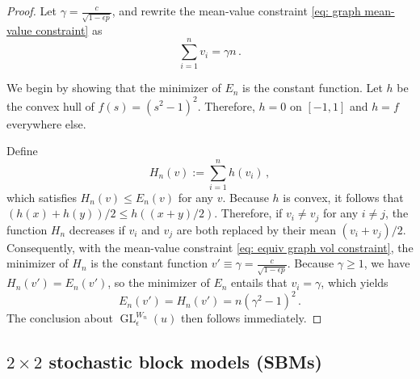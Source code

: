 \documentclass[11pt]{amsart}
\def\ep{\epsilon}
\def\GL{\operatorname{GL}}
\numberwithin{equation}{section}
\begin{document}
\begin{proof}
    Let $\gamma = \frac{c}{\sqrt{1 - \ep p}}$, and rewrite the {mean-value constraint} \eqref{eq: graph mean-value constraint} as 
    \begin{equation}\label{eq: equiv graph vol constraint}
        \sum_{i = 1}^n v_i = \gamma n \,. 
    \end{equation}    
    
    We begin by showing that the minimizer of $E_n$ is
    the constant function. Let $h$ be the convex hull of $f(s) = (s^2 - 1)^2${. Therefore,} $h = 0$ on $[-1,1]$ and $h = f$ everywhere else. 
 
 
    
   Define 
    \begin{equation*}
        H_n(v) := \sum_{i = 1}^n h(v_i) \,,
    \end{equation*}
which satisfies $H_n(v) \leq E_n(v)$ for any $v$.
Because $h$ is convex, it follows that $(h(x) + h(y))/2 \leq h\left((x + y)/2\right)$. Therefore, if $v_i \neq v_j$ for any $i \neq j$, the function $H_n$ decreases if $v_i$ and $v_j$ are both replaced by their mean $(v_i + v_j)/2$. Consequently, with the {mean-value constraint} \eqref{eq: equiv graph vol constraint}, the minimizer of $H_n$ is the constant function $v' \equiv \gamma = \frac{c}{\sqrt{1 - \ep p}}$. 
    Because $\gamma\geq 1$, we have $H_n(v') = E_n(v')$, so the minimizer of $E_n$ entails that $v_i = \gamma$, which yields 
    \begin{equation*}
    	E_n(v') = H_n(v') = n \left(\gamma^2 - 1\right)^2\,. 
    \end{equation*}
    The conclusion about $\GL^{W_n}_\ep(u)$ then follows immediately.
 \end{proof}   




\subsection{\texorpdfstring{$2 \times 2$ stochastic block models (SBMs)}{2 x 2 stochastic block models (SBMs)}} \label{sec: sbm}
\end{document}
